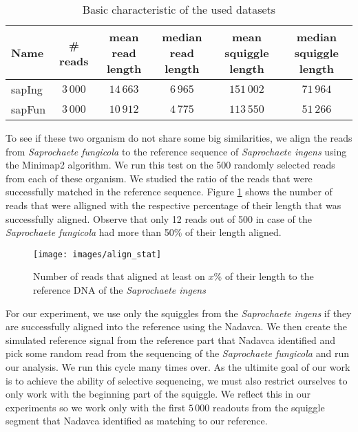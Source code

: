 \begin{table}
\caption[TODO]{Basic characteristic of the used datasets}
\label{tab:datasetChar}
\begin{center}
\begin{tabular}{lccccc}
\hline 
Name & \# reads & \specialcell{mean read\\length} & \specialcell{median read\\length} & \specialcell{mean squiggle\\length} &  \specialcell{median squiggle\\length}\\
\hline
sapIng & $3\,000$ & $14\,663$ & $6\,965$ & $151\,002$ & $71\,964$ \\
sapFun & $3\,000$ & $10\,912$ & $4\,775$ & $113\,550$ & $51\,266$ \\
\hline
\end{tabular}
\end{center}
\end{table}

To see if these two organism do not share some big similarities, we align the reads from
\emph{Saprochaete fungicola} to the reference sequence of \emph{Saprochaete ingens} using the Minimap2
algorithm. We run this test on the 500 randomly selected reads from each of these organism. We studied
the ratio of the reads that were successfully matched in the reference sequence. Figure \ref{obr:align_stat}
shows the number of reads that were alligned with the respective percentage of their length that was successfully aligned.
Observe that only 12 reads out of 500 in case of the \emph{Saprochaete fungicola} had more than 50\% of their length aligned.

\begin{figure}
\centerline{\texttt{[image: images/align\_stat]}}
\caption[TODO]{Number of reads that aligned at least on $x$\% of their length to the reference DNA of the \emph{Saprochaete ingens}}
\label{obr:align_stat}
\end{figure}

For our experiment, we use only the squiggles from the \emph{Saprochaete ingens} if they
are successfully aligned into the reference using the Nadavca. We then create the
simulated reference signal from the reference part that Nadavca identified and pick
some random read from the sequencing of the \emph{Saprochaete fungicola} and run our analysis.
We run this cycle many times over. As the ultimite goal of our work is to achieve
the ability of selective sequencing, we must also restrict ourselves to only work with
the beginning part of the squiggle. We reflect this in our experiments so we
work only with the first $5\,000$ readouts from the squiggle segment that Nadavca identified
as matching to our reference.

